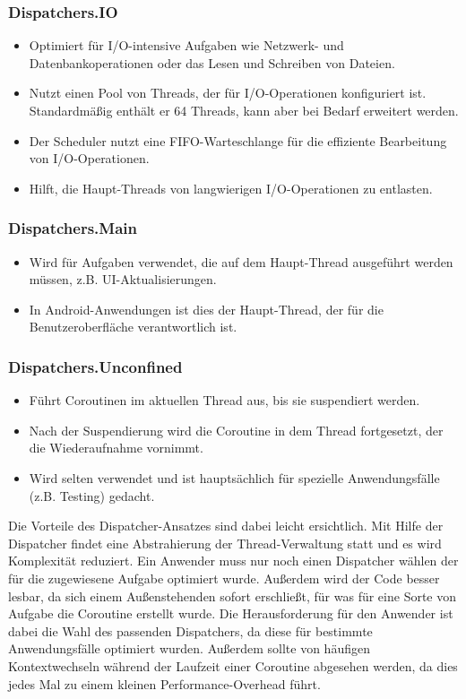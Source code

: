 \documentclass[fontsize=12pt,paper=a4,twoside=semi,parskip=half-,headsepline,headinclude]{scrreprt}
\begin{document}
\subsubsection{Dispatchers.IO}

\begin{itemize}
	\item Optimiert für I/O-intensive Aufgaben wie Netzwerk- und Datenbankoperationen oder das Lesen und Schreiben von Dateien.
	\item Nutzt einen Pool von Threads, der für I/O-Operationen konfiguriert ist.  Standardmäßig enthält er 64 Threads, kann aber bei Bedarf erweitert werden.
	\item Der Scheduler nutzt eine FIFO-Warteschlange für die effiziente Bearbeitung von I/O-Operationen.
	\item Hilft, die Haupt-Threads von langwierigen I/O-Operationen zu entlasten.
\end{itemize}

\subsubsection{Dispatchers.Main}

\begin{itemize}
	\item Wird für Aufgaben verwendet, die auf dem Haupt-Thread ausgeführt werden müssen, z.B. UI-Aktualisierungen.
	\item In Android-Anwendungen ist dies der Haupt-Thread, der für die Benutzeroberfläche verantwortlich ist.
\end{itemize}

\subsubsection{Dispatchers.Unconfined}

\begin{itemize}
	\item Führt Coroutinen im aktuellen Thread aus, bis sie suspendiert werden.
	\item Nach der Suspendierung wird die Coroutine in dem Thread fortgesetzt, der die Wiederaufnahme vornimmt.
	\item Wird selten verwendet und ist hauptsächlich für spezielle Anwendungsfälle (z.B. Testing) gedacht.
\end{itemize}

Die Vorteile des Dispatcher-Ansatzes sind dabei leicht ersichtlich. Mit Hilfe der Dispatcher findet eine Abstrahierung der Thread-Verwaltung statt und es wird Komplexität reduziert. Ein Anwender muss nur noch einen Dispatcher wählen der für die zugewiesene Aufgabe optimiert wurde. Außerdem wird der Code besser lesbar, da sich einem Außenstehenden sofort erschließt, für was für eine Sorte von Aufgabe die Coroutine erstellt wurde. Die Herausforderung für den Anwender ist dabei die Wahl des passenden Dispatchers, da diese für bestimmte Anwendungsfälle optimiert wurden. Außerdem sollte von häufigen Kontextwechseln während der Laufzeit einer Coroutine abgesehen werden, da dies jedes Mal zu einem kleinen  Performance-Overhead führt.
\end{document}
